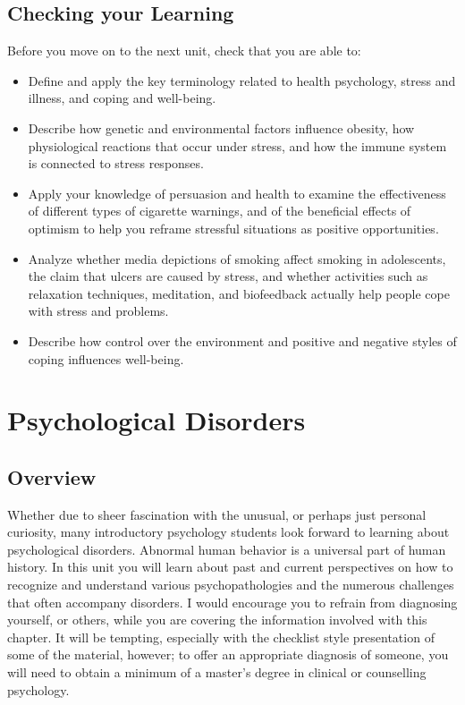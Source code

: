 \documentclass[
]{book}
\begin{document}
\hypertarget{checking-your-learning-8}{%
\section*{Checking your Learning}\label{checking-your-learning-8}}

\begin{progress}
Before you move on to the next unit, check that you are able to:

\begin{itemize}
\item
  Define and apply the key terminology related to health psychology, stress and illness, and coping and well-being.
\item
  Describe how genetic and environmental factors influence obesity, how physiological reactions that occur under stress, and how the immune system is connected to stress responses.
\item
  Apply your knowledge of persuasion and health to examine the effectiveness of different types of cigarette warnings, and of the beneficial effects of optimism to help you reframe stressful situations as positive opportunities.
\item
  Analyze whether media depictions of smoking affect smoking in adolescents, the claim that ulcers are caused by stress, and whether activities such as relaxation techniques, meditation, and biofeedback actually help people cope with stress and problems.
\item
  Describe how control over the environment and positive and negative styles of coping influences well-being.
\end{itemize}
\end{progress}

\hypertarget{psychological-disorders}{%
\chapter{Psychological Disorders}\label{psychological-disorders}}

\hypertarget{overview-9}{%
\section*{Overview}\label{overview-9}}

Whether due to sheer fascination with the unusual, or perhaps just personal curiosity, many introductory psychology students look forward to learning about psychological disorders. Abnormal human behavior is a universal part of human history. In this unit you will learn about past and current perspectives on how to recognize and understand various psychopathologies and the numerous challenges that often accompany disorders. I would encourage you to refrain from diagnosing yourself, or others, while you are covering the information involved with this chapter. It will be tempting, especially with the checklist style presentation of some of the material, however; to offer an appropriate diagnosis of someone, you will need to obtain a minimum of a master's degree in clinical or counselling psychology.
\end{document}
